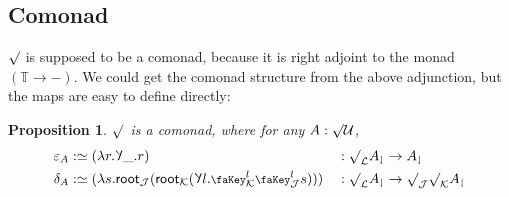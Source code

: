 \documentclass[10pt]{article}
\newtheorem{proposition}[theorem]{Proposition}
\theoremstyle{definition}
\let\oldequiv\equiv%
\renewcommand{\equiv}{\simeq}
\newcommand{\defeq}{\oldequiv}
\newcommand*{\univ}{\mathcal{U}}
\newcommand{\key}{\mathchoice
{\scalebox{0.8}{\text{\faKey}}}
{\scalebox{0.8}{\text{\faKey}}}
{\scalebox{0.5}{\text{\faKey}}}
{\scalebox{0.4}{\text{\faKey}}}
}
\newcommand{\Tiny}{\mathbb{T}}
\newcommand{\lockn}[1]{\mathcal{#1}}
\newcommand{\varkey}[2]{\key_{\lockn{#1}}^{#2}}
\newcommand{\rform}[2]{\surd_{\lockn{#1}} #2}
\newcommand{\rformu}[1]{\surd #1}
\newcommand{\rintro}[2]{\mathsf{root}_{\lockn{#1}}(#2)}
\newcommand{\rbindsym}{\scalerel*{\reflectbox{\rotatebox[origin=c]{180}{$\lambda$}}}{\lambda}}
\newcommand{\relim}[1]{\rbindsym #1}
\newcommand{\rget}[1]{{#1}_{\downharpoonleft}}
\begin{document}
\subsection{Comonad}
$\rformu$ is supposed to be a comonad, because it is right adjoint to the monad $(\Tiny \to -)$. We could get the comonad structure from the above adjunction, but the maps are easy to define directly:

\begin{proposition}
$\rform{}$ is a comonad, where for any $A : \rformu \univ$,
\begin{alignat*}{2}
\varepsilon_A &:\defeq (\lambda r. \relim{\_.r}) &&: \rform{L} \rget{A} \to \rget{A} \\
\delta_A &:\defeq (\lambda s. \rintro{J}{\rintro{K}{\relim{l.\varkey{K}{l}\varkey{J}{l}s}}}) &&: \rform{L} \rget{A} \to \rform{J} \rform{K} \rget{A}
\end{alignat*}
\end{proposition}
\end{document}
